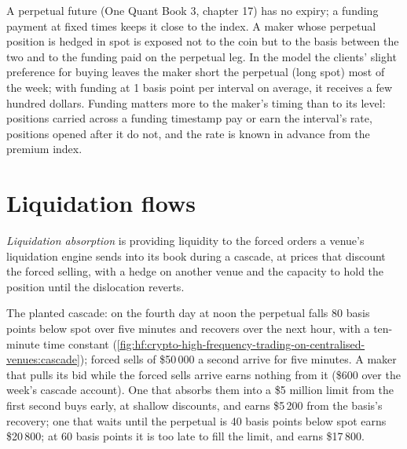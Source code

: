 A perpetual future (One Quant Book 3, chapter 17) has no expiry; a funding payment at fixed times keeps it close to the index. A maker whose
perpetual position is hedged in spot is exposed not to the coin but to the basis between the two and to the funding paid on the perpetual leg. In the
model the clients' slight preference for buying leaves the maker short the perpetual (long spot) most of the week; with funding at 1 basis point
per interval on average, it receives a few hundred dollars. Funding matters more to the maker's timing than to its level: positions carried across
a funding timestamp pay or earn the interval's rate, positions opened after it do not, and the rate is known in advance from the premium index.

\section{Liquidation flows}

\begin{definition}\label{def:hf:crypto-high-frequency-trading-on-centralised-venues:absorb}
\emph{Liquidation absorption} is providing liquidity to the forced orders a venue's liquidation engine sends into its
book during a cascade, at prices that discount the forced selling, with a hedge on another venue and the capacity to hold the position until the
dislocation reverts.
\end{definition}

The planted cascade: on the fourth day at noon the perpetual falls 80 basis points below spot over five minutes and recovers over the next hour, with a ten-minute time constant
(\cref{fig:hf:crypto-high-frequency-trading-on-centralised-venues:cascade}); forced sells of \$50\,000 a second arrive for five minutes. A maker that
pulls its bid while the forced sells arrive earns nothing from it (\$600 over the week's cascade account). One that absorbs them into a \$5 million
limit from the first second buys early, at shallow discounts, and earns \$5\,200 from the basis's recovery; one that waits until the perpetual is
40 basis points below spot earns \$20\,800; at 60 basis points it is too late to fill the limit, and earns \$17\,800.

